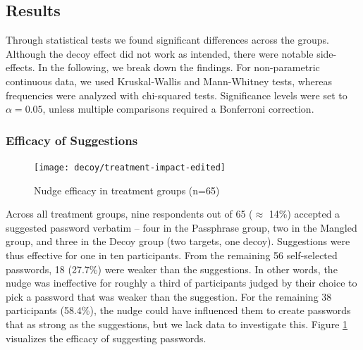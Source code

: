 

\subsection{Results}
Through statistical tests we found significant differences across the groups. Although the decoy effect did not work as intended, there were notable side-effects. In the following, we break down the findings. For non-parametric continuous data, we used Kruskal-Wallis and Mann-Whitney tests, whereas frequencies were analyzed with chi-squared tests. Significance levels were set to $\alpha = 0.05$, unless multiple comparisons required a Bonferroni correction. 

\subsubsection{Efficacy of Suggestions} 
\begin{figure}
	\centering
	\texttt{[image: decoy/treatment-impact-edited]}
	\caption{\label{fig:decoy:treatment-impact-edited} Nudge efficacy in treatment groups (n=65)}
\end{figure}
Across all treatment groups, nine respondents out of 65 ($\approx$ 14\%) accepted a suggested password verbatim -- four in the Passphrase group, two in the Mangled group, and three in the Decoy group (two targets, one decoy). Suggestions were thus effective for one in ten participants. From the remaining 56 self-selected passwords, 18 (27.7\%) were weaker than the suggestions. In other words, the nudge was ineffective for roughly a third of participants judged by their choice to pick a password that was weaker than the suggestion. For the remaining 38 participants (58.4\%), the nudge could have influenced them to create passwords that as strong as the suggestions, but we lack data to investigate this. Figure \ref{fig:decoy:treatment-impact-edited} visualizes the efficacy of suggesting passwords.

